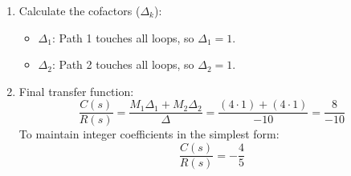 \documentclass[11pt]{article}
\begin{document}
\begin{enumerate}[label=(\alph*), itemindent=*, leftmargin=*, nolistsep]
    \item Calculate the cofactors ($\Delta_k$):
    \begin{itemize}
        \item $\Delta_1$: Path 1 touches all loops, so $\Delta_1 = 1$.
        \item $\Delta_2$: Path 2 touches all loops, so $\Delta_2 = 1$.
    \end{itemize}

    \item Final transfer function:
    \[
    \frac{C(s)}{R(s)} = \frac{M_1 \Delta_1 + M_2 \Delta_2}{\Delta} = \frac{(4 \cdot 1) + (4 \cdot 1)}{-10} = \frac{8}{-10}
    \]
    To maintain integer coefficients in the simplest form:
    \[
    \boxed{
    \frac{C(s)}{R(s)} = -\frac{4}{5}
    }
    \]
\end{enumerate}

\clearpage
\end{document}
